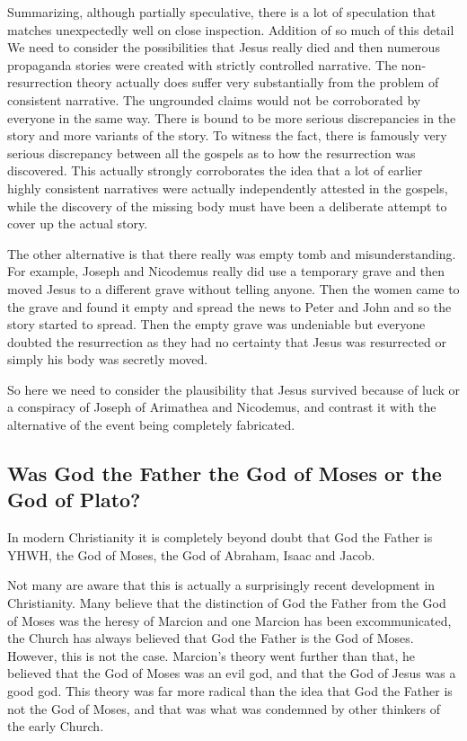 Summarizing, although partially speculative, there is a lot of speculation that matches unexpectedly well on close inspection.
Addition of so much of this detail We need to consider the possibilities that Jesus really died and then numerous propaganda stories were created with strictly controlled narrative.
The non-resurrection theory actually does suffer very substantially from the problem of consistent narrative.
The ungrounded claims would not be corroborated by everyone in the same way.
There is bound to be more serious discrepancies in the story and more variants of the story.
To witness the fact, there is famously very serious discrepancy between all the gospels as to how the resurrection was discovered.
This actually strongly corroborates the idea that a lot of earlier highly consistent narratives were actually independently attested in the gospels, while the discovery of the missing body must have been a deliberate attempt to cover up the actual story.

The other alternative is that there really was empty tomb and misunderstanding.
For example, Joseph and Nicodemus really did use a temporary grave and then moved Jesus to a different grave without telling anyone.
Then the women came to the grave and found it empty and spread the news to Peter and John and so the story started to spread.
Then the empty grave was undeniable but everyone doubted the resurrection as they had no certainty that Jesus was resurrected or simply his body was secretly moved.

So here we need to consider the plausibility that Jesus survived because of luck or a conspiracy of Joseph of Arimathea and Nicodemus, and contrast it with the alternative of the event being completely fabricated.

\subsection{Was God the Father the God of Moses or the God of Plato?}\label{par:sec:was-god-the-father-the-god-of-moses-or-the-god-of-plato}

In modern Christianity it is completely beyond doubt that God the Father is YHWH, the God of Moses, the God of Abraham, Isaac and Jacob.

Not many are aware that this is actually a surprisingly recent development in Christianity.
Many believe that the distinction of God the Father from the God of Moses was the heresy of Marcion and one Marcion has been excommunicated, the Church has always believed that God the Father is the God of Moses.
However, this is not the case.
Marcion's theory went further than that, he believed that the God of Moses was an evil god, and that the God of Jesus was a good god.
This theory was far more radical than the idea that God the Father is not the God of Moses, and that was what was condemned by other thinkers of the early Church.

